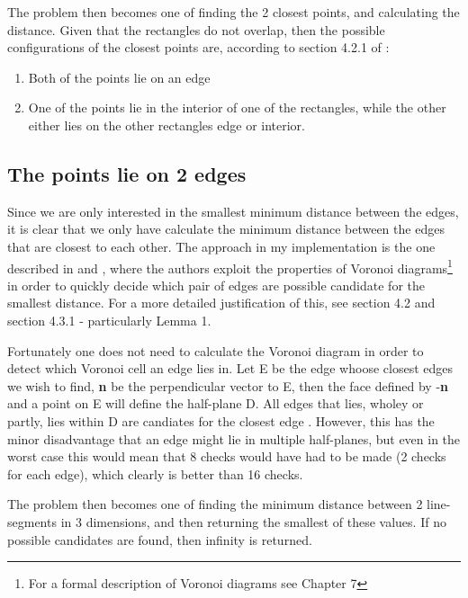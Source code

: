 The problem then becomes one of finding the 2 closest points, and calculating the distance.
Given that the rectangles do not overlap, then the possible configurations of the closest points are, according to section 4.2.1 of \cite{Larsen99fastproximity}:
\begin{enumerate}
\item Both of the points lie on an edge
\item One of the points lie in the interior of one of the rectangles, while the other either lies on the other rectangles edge or interior.
\end{enumerate}

\subsection{The points lie on 2 edges}
\label{minimumDistance}
Since we are only interested in the smallest minimum distance between the edges, it is clear that we only have calculate the minimum distance between the edges that are closest to each other. The approach in my implementation is the one described in \cite{larsen00fast} and \cite{Larsen99fastproximity}, where the authors exploit the properties of Voronoi diagrams\footnote{For a formal description of Voronoi diagrams see \cite{compgeom:2008} Chapter 7} in order to quickly decide which pair of edges are possible candidate for the smallest distance. For a more detailed justification of this, see \cite{larsen00fast} section 4.2 and \cite{Larsen99fastproximity} section 4.3.1 - particularly Lemma 1.

Fortunately one does not need to calculate the Voronoi diagram in order to detect which Voronoi cell an edge lies in. Let E be the edge whoose closest edges we wish to find, \textbf{n} be the perpendicular vector to E, then the face defined by -\textbf{n} and a point on E will define the half-plane D. All edges that lies, wholey or partly, lies within D are candiates for the closest edge \cite{larsen00fast} . However, this has the minor disadvantage that an edge might lie in multiple half-planes, but even in the worst case this would mean that 8 checks would have had to be made (2 checks for each edge), which clearly is better than 16 checks.

The problem then becomes one of finding the minimum distance between 2 line-segments in 3 dimensions, and then returning the smallest of these values. If no possible candidates are found, then infinity is returned.

